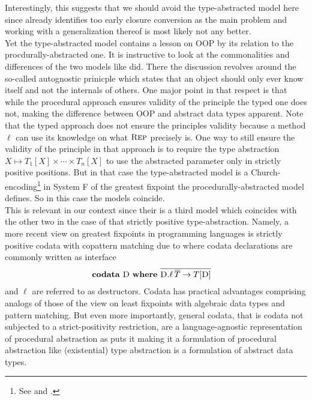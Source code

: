Interestingly, this suggests that we should avoid the type-abstracted model here since \cite{thorin} already identifies too early closure conversion as the main problem and working with a generalization thereof is most likely not any better.
\\
Yet the type-abstracted model contains a lesson on OOP by its relation to the procdurally-abstracted one.
It is instructive to look at the commonalities and differences of the two models like \cite{cook} did.
There the discussion revolves around the so-called {\glqq}autognostic prinicple{\grqq} which states that an object should only ever know itself and not the internals of others.
One major point in that respect is that while the procedural approach ensures validity of the principle the typed one does not, making the difference between OOP and abstract data types apparent.
Note that the typed approach does not ensure the principles validity because a method $\ell$ can use its knowledge on what $\textsc{Rep}$ precisely is.
One way to still ensure the validity of the principle in that approach is to require the type abstraction $X \mapsto T_{1}[X] \times \cdots \times T_{n}[X]$ to use the abstracted parameter only in strictly positive positions.
But in that case the type-abstracted model is a Church-encoding\footnote{See \cite{wadler} and \cite{gibbons}.} in System F of the greatest fixpoint the procedurally-abstracted model defines.
So in this case the models coincide.
\\
This is relevant in our context since their is a third model which coincides with the other two in the case of that strictly positive type-abstraction.
Namely, a more recent view on greatest fixpoints in programming languages is strictly positive codata with copattern matching due to \cite{abel} where codata declarations are commonly written as interface
\begin{align*}
  &
  \mathbf{codata}\
  \textsc{D}\
  \mathbf{where}\
  \overline{\textsc{D}.\ell\,\overline{T} \to T[\textsc{D}]}
\end{align*}
and $\ell$ are referred to as destructors.
Codata has practical advantages comprising analogs of those of the view on least fixpoints with algebraic data types and pattern matching.
But even more importantly, general codata, that is codata not subjected to a strict-positivity restriction, are a {\glqq}language-agnostic representation of procedural abstraction{\grqq} as \cite{codata in action} puts it making it a formulation of procedural abstraction like (existential) type abstraction is a formulation of abstract data types.
